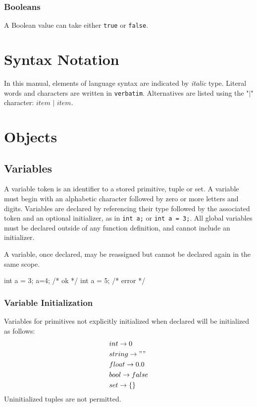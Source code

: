 		\subsubsection{Booleans}
		A Boolean value can take either \verb|true| or \verb|false|.

\section{Syntax Notation}
In this manual, elements of language syntax are indicated by \textit{italic} type.  Literal words and characters are written in \verb|verbatim|.  Alternatives are listed using the "$\lvert$" character: $\textit{item $\lvert$ item}$.

\section{Objects}
\subsection{Variables}
A variable token is an identifier to a stored primitive, tuple or set.  A variable must begin with an alphabetic character followed by zero or more letters and digits.  Variables are declared by referencing their type followed by the associated token and an optional initializer, as in \verb|int a;| or \verb|int a = 3;|.  All global variables must be declared outside of any function definition, and cannot include an initializer.
	
A variable, once declared, may be reassigned but cannot be declared again in the same scope.
	
\begin{code}
int a = 3;
a=4;         /* ok    */
int a = 5;   /* error */
\end{code}
	
	\subsubsection{Variable Initialization}
	Variables for primitives not explicitly initialized when declared will be initialized as follows:
	\begin{align*}
	&int \to 0\\
	&string \to ""\\
	&float \to 0.0\\
	&bool \to false\\
	&set \to \lbrace  \rbrace
    \end{align*}
	Uninitialized tuples are not permitted.

